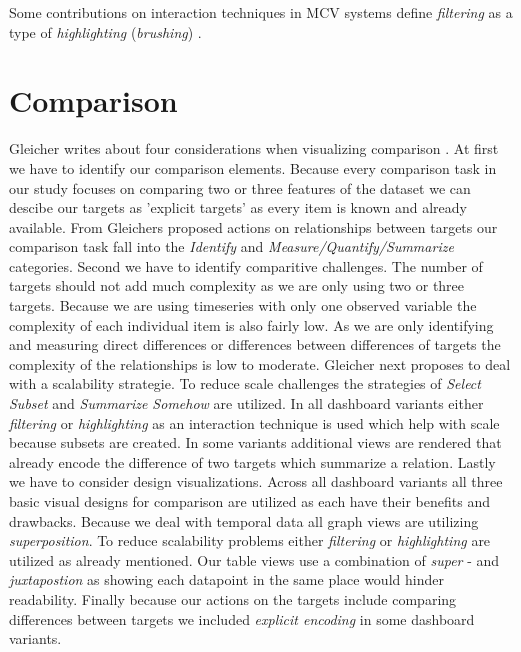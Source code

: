 Some contributions on interaction techniques in MCV systems define \textit{filtering} as a type of
\textit{highlighting} (\textit{brushing}) \citep*{Ward.}.

\section{Comparison}
Gleicher writes about four considerations when visualizing comparison \citep*{Gleicher.2018}.
At first we have to identify our comparison elements. Because every comparison task in our
study focuses on comparing two or three features of the dataset we can descibe our targets as
'explicit targets' as every item is known and already available. From Gleichers proposed
actions on relationships between targets our comparison task fall into the \textit{Identify}
and \textit{Measure/Quantify/Summarize} categories. Second we have to identify comparitive
challenges. The number of targets should not add much complexity as we are only using two
or three targets. Because we are using timeseries with only one observed variable the
complexity of each individual item is also fairly low. As we are only identifying and
measuring direct differences or differences between differences of targets the complexity
of the relationships is low to moderate. Gleicher next proposes to deal with a scalability
strategie. To reduce scale challenges the strategies of \textit{Select Subset} and 
\textit{Summarize Somehow} are utilized. In all dashboard variants either \textit{filtering} or
\textit{highlighting} as an interaction technique is used which help with scale because subsets
are created. In some variants additional views are rendered that already encode the
difference of two targets which summarize a relation. Lastly we have to consider design
visualizations. Across all dashboard variants all three basic visual designs for comparison
are utilized as each have their benefits and drawbacks. Because we deal with temporal data
all graph views are utilizing \textit{superposition}. To reduce scalability problems either
\textit{filtering} or \textit{highlighting} are utilized as already mentioned. Our table views
use a combination of \textit{super} - and \textit{juxtapostion} as showing each datapoint in the
same place would hinder readability. Finally because our actions on the targets include comparing
differences between targets we included \textit{explicit encoding} in some dashboard variants.